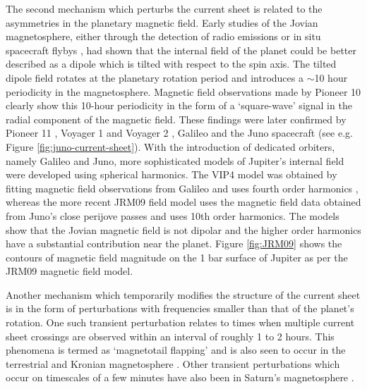 The second mechanism which perturbs the current sheet is related to the asymmetries in the planetary magnetic field. Early studies of the Jovian magnetosphere, either through the detection of radio emissions \cite{Carr1969TheJupiter} or in situ spacecraft flybys \cite{Smith1974The10}, had shown that the internal field of the planet could be better described as a dipole which is tilted with respect to the spin axis. The tilted dipole field rotates at the planetary rotation period and introduces a $\sim$10 hour periodicity in the magnetosphere. Magnetic field observations made by Pioneer 10 \cite{Smith1974The10} clearly show this 10-hour periodicity in the form of a `square-wave' signal in the radial component of the magnetic field. These findings were later confirmed by Pioneer 11 \cite{Smith1975Jupiters11}, Voyager 1 and Voyager 2 \cite{Behannon1981}, Galileo \cite{Khurana1992a, Khurana2005} and the Juno spacecraft (see e.g. Figure \ref{fig:juno-current-sheet}). With the introduction of dedicated orbiters, namely Galileo and Juno, more sophisticated models of Jupiter's internal field were developed using spherical harmonics. The VIP4 model was obtained by fitting magnetic field observations from Galileo and uses fourth order harmonics \cite{Connerney1998NewFootprint}, whereas the more recent JRM09 field model \cite{Connerney2018} uses the magnetic field data obtained from Juno's close perijove passes and uses 10th order harmonics. The models show that the Jovian magnetic field is not dipolar and the higher order harmonics have a substantial contribution near the planet. Figure \ref{fig:JRM09} shows the contours of magnetic field magnitude on the 1 bar surface of Jupiter as per the JRM09 magnetic field model. 

Another mechanism which temporarily modifies the structure of the current sheet is in the form of perturbations with frequencies smaller than that of the planet's rotation. One such transient perturbation relates to times when multiple current sheet crossings are observed within an interval of roughly 1 to 2 hours. This phenomena is termed as `magnetotail flapping' and is also seen to occur in the terrestrial and Kronian magnetosphere \cite{Volwerk2013ComparativeSaturn}. Other transient perturbations which occur on timescales of a few minutes have also been in Saturn's magnetosphere \cite{Martin2017CassiniMagnetodisc}.  

